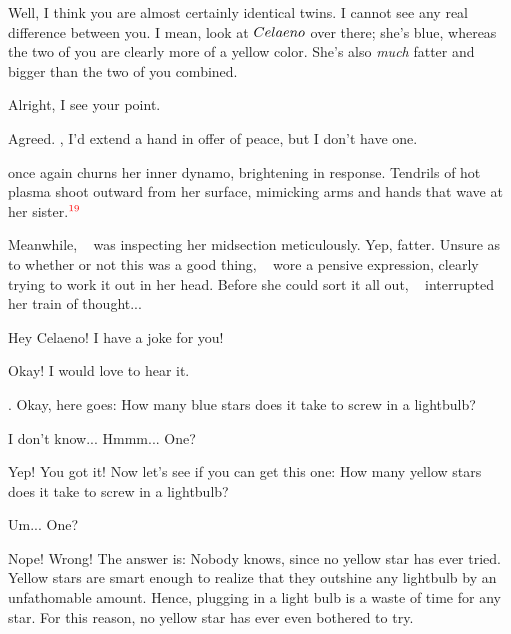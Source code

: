 \documentclass[main.tex]{subfiles}
\begin{document}
\par \Maia Well, I think you are almost certainly identical twins.  I cannot see any real difference between you.  I mean, look at $Celaeno$ over there; she's blue, whereas the two of you are clearly more of a yellow color.  She's also \textit{much} fatter and bigger than the two of you combined.  

\par \Celaeno Alright, I see your point.

\par \Taygete Agreed.  \rmalcyone, I'd extend a hand in offer of peace, but I don't have one.

\par \nar \rmtaygete once again churns her inner dynamo, brightening in response.  Tendrils of hot plasma shoot outward from her surface, mimicking arms and hands that wave at her sister.$^{\textcolor{red}{19}}$

\par \nar Meanwhile, \rmcelaeno~ was inspecting her midsection meticulously.  Yep, fatter.  Unsure as to whether or not this was a good thing, \rmcelaeno~ wore a pensive expression, clearly trying to work it out in her head.  Before she could sort it all out, \rmtaygete~ interrupted her train of thought...

\par \Taygete Hey Celaeno!  I have a joke for you!

\par \Celaeno Okay!  I would love to hear it.

\par \Taygete. Okay, here goes:  How many blue stars does it take to screw in a lightbulb?

\par \Celaeno I don't know... Hmmm... One?

\par \Taygete Yep!  You got it!  Now let's see if you can get this one:  How many yellow stars does it take to screw in a lightbulb?

\par \Celaeno Um... One?

\par \Taygete Nope!  Wrong!  The answer is:  Nobody knows, since no yellow star has ever tried.  Yellow stars are smart enough to realize that they outshine any lightbulb by an unfathomable amount.   Hence, plugging in a light bulb is a waste of time for any star. For this reason, no yellow star has ever even bothered to try.
\end{document}
